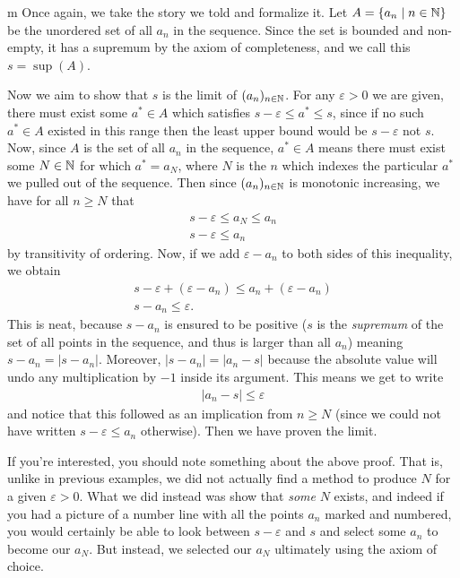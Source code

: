 \documentclass[11pt]{article}
\begin{document}
\begin{my proof}{m}
Once again, we take the story we told and formalize it. Let $A = \{ a_n \mid n\in \mathbb{N} \}$ be the unordered set of all $a_n$ in the sequence. Since the set is bounded and non-empty, it has a supremum by the axiom of completeness, and we call this $s = \sup(A)$.

Now we aim to show that $s$ is the limit of $(a_n)_{n \in \mathbb{N}}$. For any $\varepsilon > 0$ we are given, there must exist some $a^* \in A$ which satisfies $s - \varepsilon \le a^* \le s$, since if no such $a^* \in A$ existed in this range then the least upper bound would be $s - \varepsilon$ not $s$. Now, since $A$ is the set of all $a_n$ in the sequence, $a^* \in A$ means there must exist some $N \in \mathbb{N}$ for which $a^* = a_N$, where $N$ is the $n$ which indexes the particular $a^*$ we pulled out of the sequence. Then since $(a_n)_{n\in \mathbb{N}}$ is monotonic increasing, we have for all $n \ge N$ that \begin{gather*}
s - \varepsilon \le a_N \le a_n \\
s - \varepsilon \le a_n
\end{gather*}
by transitivity of ordering. Now, if we add $\varepsilon - a_n$ to both sides of this inequality, we obtain \begin{gather*}
s - \varepsilon + (\varepsilon - a_n) \le a_n + (\varepsilon - a_n) \\
s - a_n \le \varepsilon.
\end{gather*}
This is neat, because $s-a_n$ is ensured to be positive ($s$ is the \emph{supremum} of the set of all points in the sequence, and thus is larger than all $a_n$) meaning $s - a_n = |s - a_n|$. Moreover, $|s-a_n| = |a_n - s|$ because the absolute value will undo any multiplication by $-1$ inside its argument. This means we get to write \begin{gather*}
|a_n - s| \le \varepsilon
\end{gather*}
and notice that this followed as an implication from $n \ge N$ (since we could not have written $s- \varepsilon \le a_n$ otherwise). Then we have proven the limit. 
\end{my proof}

If you're interested, you should note something about the above proof. That is, unlike in previous examples, we did not actually find a method to produce $N$ for a given $\varepsilon > 0$. What we did instead was show that \emph{some} $N$ exists, and indeed if you had a picture of a number line with all the points $a_n$ marked and numbered, you would certainly be able to look between $s-\varepsilon$ and $s$ and select some $a_n$ to become our $a_N$. But instead, we selected our $a_N$ ultimately using the axiom of choice.
\end{document}
